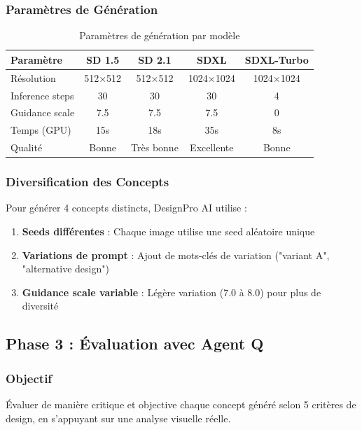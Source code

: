 \subsubsection{Paramètres de Génération}

\begin{table}[H]
\centering
\caption{Paramètres de génération par modèle}
\label{tab:generation_params}
\begin{tabular}{@{}lcccc@{}}
\toprule
\textbf{Paramètre} & \textbf{SD 1.5} & \textbf{SD 2.1} & \textbf{SDXL} & \textbf{SDXL-Turbo} \\ 
\midrule
Résolution & 512×512 & 512×512 & 1024×1024 & 1024×1024 \\
Inference steps & 30 & 30 & 30 & 4 \\
Guidance scale & 7.5 & 7.5 & 7.5 & 0 \\
Temps (GPU) & 15s & 18s & 35s & 8s \\
Qualité & Bonne & Très bonne & Excellente & Bonne \\
\bottomrule
\end{tabular}
\end{table}

\subsubsection{Diversification des Concepts}

Pour générer 4 concepts distincts, DesignPro AI utilise :

\begin{enumerate}[leftmargin=*]
    \item \textbf{Seeds différentes} : Chaque image utilise une seed aléatoire unique
    \item \textbf{Variations de prompt} : Ajout de mots-clés de variation ("variant A", "alternative design")
    \item \textbf{Guidance scale variable} : Légère variation (7.0 à 8.0) pour plus de diversité
\end{enumerate}

\subsection{Phase 3 : Évaluation avec Agent Q}

\subsubsection{Objectif}

Évaluer de manière critique et objective chaque concept généré selon 5 critères de design, en s'appuyant sur une analyse visuelle réelle.

